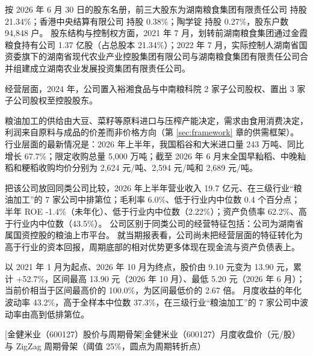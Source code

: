  按 2026 年 6 月 30 日的股东名册，前三大股东为湖南粮食集团有限责任公司 持股 21.34\%；香港中央结算有限公司 持股 0.38\%；陶学锭 持股 0.27\%，股东户数 94,848 户。 股东结构与控制权方面，2021 年 7 月，划转前湖南粮食集团通过金霞粮食持有公司 1.37 亿股（占总股本 21.34\%）；2022 年 7 月，实际控制人湖南省国资委旗下的湖南省现代农业产业控股集团有限公司与湖南粮食集团有限责任公司合并组建成立湖南农业发展投资集团有限责任公司。

 经营层面，2024 年，公司置入裕湘食品与中南粮科院 2 家子公司股权、置出 3 家子公司股权至控股股东。

 粮油加工的供给由大豆、菜籽等原料进口与压榨产能决定，需求由食用消费决定，利润来自原料与成品的价差而非价格方向（第 \ref{sec:framework} 章的供需框架）。 行业层面的最新情况是：2026 年上半年，我国稻谷和大米进口量 243 万吨、同比增长 67.7\%；限定收购总量 5,000 万吨；截至 2026 年 6 月末全国早籼稻、中晚籼稻和粳稻收购均价分别为 2,624 元/吨、2,594 元/吨和 2,689 元/吨。

 把该公司放回同类公司比较，2026 年上半年营业收入 19.7 亿元、在三级行业“粮油加工”的 7 家公司中排第位；毛利率 6.0\%、低于行业内中位数 0.4 个百分点；半年 ROE -1.4\%（未年化）、低于行业内中位数（2.22\%）；资产负债率 62.2\%、高于行业内中位数（43.5\%）。 公司区别于同类公司的经营特征包括：公司为湖南省属国资控股的粮油上市平台。 就当期报表看，公司尚未把经营层面的特征转化为高于行业的资本回报，周期底部的相对优势更多体现在现金流与资产负债表上。

 以 2021 年 1 月为起点、2026 年 10 月为终点，股价由 9.10 元变为 13.90 元，累计 +52.7\%，区间最高 13.90 元（2026 年 10 月）、最低 5.20 元（2026 年 6 月）；当前价相当于区间最高价的 100.0\%，为区间最低价的 2.67 倍。 月度收益的年化波动率 43.2\%，高于全样本中位数 37.3\%，在三级行业“粮油加工”的 7 家公司中波动率由高到低排第位。

\begin{center}
\begin{minipage}{\textwidth}\centering
{}

[金健米业（600127）股价与周期骨架]{金健米业（600127）月度收盘价（元/股）与 ZigZag 周期骨架（阈值 25\%，圆点为周期转折点）}
\end{minipage}
\end{center}

